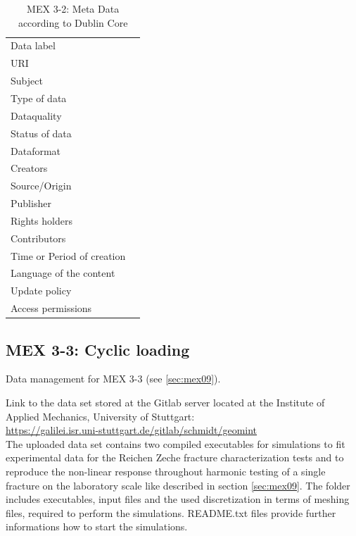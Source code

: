 \begin{table}[h!]
\caption{MEX 3-2: Meta Data according to Dublin Core}
\label{tab:}
\small
\begin{tabular}{R{3cm}|L{7cm}}
\hline
%
Data label &  \\
URI &  \\
Subject  &  \\
Type of data  &  \\
Dataquality  &  \\
Status of data  &  \\
Dataformat  & \\
Creators  &  \\
Source/Origin &  \\
Publisher  &  \\
Rights holders &  \\
Contributors &  \\
Time or Period of creation &  \\
Language of the content &  \\
Update policy &  \\
Access permissions &  \\
%
\hline
\end{tabular}
\end{table}


\subsection{MEX 3-3: Cyclic loading}

Data management for MEX 3-3 (see \ref{sec:mex09}).

Link to the data set stored at the Gitlab server located at the Institute of Applied Mechanics, University of Stuttgart:\\
\hyperlink{https://galilei.isr.uni-stuttgart.de/gitlab/schmidt/geomint}{https://galilei.isr.uni-stuttgart.de/gitlab/schmidt/geomint}\\

The uploaded data set contains two compiled executables for simulations to fit experimental data for the Reichen Zeche fracture characterization tests and to reproduce the non-linear response throughout harmonic testing of a single fracture on the laboratory scale like described in section \ref{sec:mex09}. The folder includes executables, input files and the used discretization in terms of meshing files, required to perform the simulations. README.txt files provide further informations how to start the simulations.

